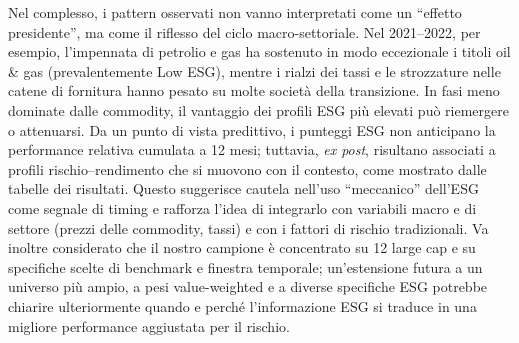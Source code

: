 \documentclass[12pt,a4paper]{article}
\begin{document}
Nel complesso, i pattern osservati non vanno interpretati come un ``effetto presidente'', ma come il riflesso del ciclo macro-settoriale. Nel 2021--2022, per esempio, l'impennata di petrolio e gas ha sostenuto in modo eccezionale i titoli oil \& gas (prevalentemente Low ESG), mentre i rialzi dei tassi e le strozzature nelle catene di fornitura hanno pesato su molte società della transizione. In fasi meno dominate dalle commodity, il vantaggio dei profili ESG più elevati può riemergere o attenuarsi. Da un punto di vista predittivo, i punteggi ESG non anticipano la performance relativa cumulata a 12 mesi; tuttavia, \textit{ex post}, risultano associati a profili rischio--rendimento che si muovono con il contesto, come mostrato dalle tabelle dei risultati. Questo suggerisce cautela nell'uso ``meccanico'' dell'ESG come segnale di timing e rafforza l'idea di integrarlo con variabili macro e di settore (prezzi delle commodity, tassi) e con i fattori di rischio tradizionali. Va inoltre considerato che il nostro campione è concentrato su 12 large cap e su specifiche scelte di benchmark e finestra temporale; un'estensione futura a un universo più ampio, a pesi value-weighted e a diverse specifiche ESG potrebbe chiarire ulteriormente quando e perché l'informazione ESG si traduce in una migliore performance aggiustata per il rischio.
\end{document}
